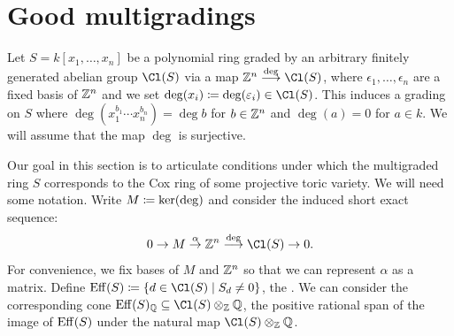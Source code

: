 \documentclass{amsart}
\begin{document}
\fi

\section{Good multigradings}\label{sec:good-gradings}

Let $S=k[x_1, \dots, x_n]$ be a polynomial ring graded by an arbitrary finitely generated abelian group $\Cl(S)$ via a map $\ZZ^n\overset{\deg}{\longrightarrow}\Cl(S)$, where $\epsilon_1, \dots, \epsilon_n$ are a fixed basis of $\mathbb Z^n$ and we set $\deg(x_i) \ce\deg(\epsilon_i)\in \Cl(S)$.  This induces a grading on $S$ where $\deg(x_1^{b_1}\cdots x_n^{b_n})= \deg b$ for $b\in\mathbb Z^n$ and $\deg(a)=0$ for $a\in k$.  We will assume that the map $\deg$ is surjective.

Our goal in this section is to articulate conditions under which the multigraded ring $S$ corresponds to the Cox ring of some projective toric variety.  We will need some notation.  Write $M\coloneqq\ker(\deg)$ and consider the induced short exact sequence:
\[
0\to M\overset{\alpha}{\to} \ZZ^n \overset{\deg}{\longrightarrow} \Cl(S) \to 0.
\]
For convenience, we fix bases of $M$ and $\mathbb Z^n$ so that we can represent $\alpha$ as a matrix.  Define $\Eff(S) \ce\{d \in \Cl(S) \mid S_d \ne 0\}$, the .  We can consider the corresponding cone $\Eff(S)_{\QQ}\subseteq \Cl(S)\otimes_{\ZZ}\QQ$, the positive rational span of the image of $\operatorname{Eff}(S)$ under the natural map $\Cl(S)\otimes_{\ZZ}\QQ$.
\end{document}
